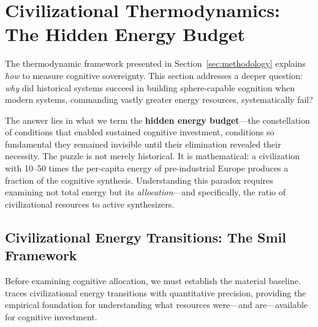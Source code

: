 % 

\section{Civilizational Thermodynamics: The Hidden Energy Budget}
\label{sec:civilizational}

The thermodynamic framework presented in Section~\ref{sec:methodology} explains \textit{how} to measure cognitive sovereignty. This section addresses a deeper question: \textit{why} did historical systems succeed in building sphere-capable cognition when modern systems, commanding vastly greater energy resources, systematically fail?

The answer lies in what we term the \textbf{hidden energy budget}---the constellation of conditions that enabled sustained cognitive investment, conditions so fundamental they remained invisible until their elimination revealed their necessity. The puzzle is not merely historical. It is mathematical: a civilization with 10--50 times the per-capita energy of pre-industrial Europe produces a fraction of the cognitive synthesis. Understanding this paradox requires examining not total energy but its \textit{allocation}---and specifically, the ratio of civilizational resources to active synthesizers.

\subsection{Civilizational Energy Transitions: The Smil Framework}

Before examining cognitive allocation, we must establish the material baseline. \citet{smil2017} traces civilizational energy transitions with quantitative precision, providing the empirical foundation for understanding what resources were---and are---available for cognitive investment.

